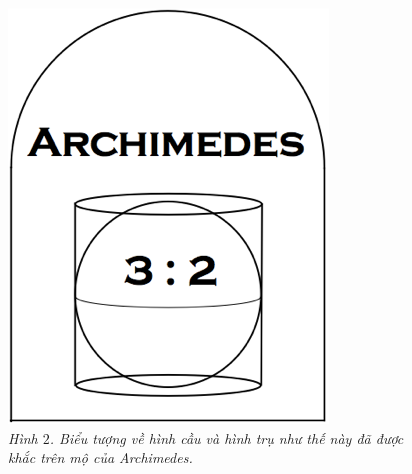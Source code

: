 \begin{multicols}{2}
	\begin{figure}[H]
		\vspace*{-5pt}
		\centering
		\captionsetup{labelformat= empty, justification=centering}
		\includegraphics[width= 0.8\linewidth]{3}
		\caption{\small\textit{\color{quantoan}Hình $2$. Biểu tượng về hình cầu và hình trụ như thế này đã được khắc trên mộ của Archimedes.}}
		\vspace*{-10pt}
	\end{figure}

\end{multicols}
